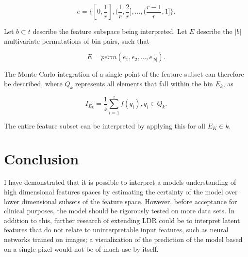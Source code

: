 \documentclass[a4paper, twocolumn]{article}
\begin{document}
$$e = \{[0, \frac{1}{r}], (\frac{1}{r}, \frac{2}{r}], \ldots, (\frac{r-1}{r}, 1]\}.$$

Let $b \subset t$ describe the feature subspace being interpreted. Let $E$ describe the $|b|$ multivariate permutations of bin pairs, such that

$$E = perm(e_1, e_2, \ldots, e_{|b|}).$$

The Monte Carlo integration of a single point of the feature subset can therefore be described, where $Q_k$ represents all elements that fall within the bin $E_k$, as

$$I_{E_k} = \frac{1}{z} \sum^z_{i=1} f(q_i), q_i \in Q_k.$$

The entire feature subset can be interpreted by applying this for all $E_K \in k$.

\section{Conclusion}\label{Conclusion}

I have demonstrated that it is possible to interpret a models understanding of high dimensional features spaces by estimating the certainty of the model over lower dimensional subsets of the feature space. However, before acceptance for clinical purposes, the model should be rigorously tested on more data sets. In addition to this, further research of extending LDR could be to interpret latent features that do not relate to uninterpretable input features, such as neural networks trained on images; a visualization of the prediction of the model based on a single pixel would not be of much use by itself.

\printbibliography
\end{document}

